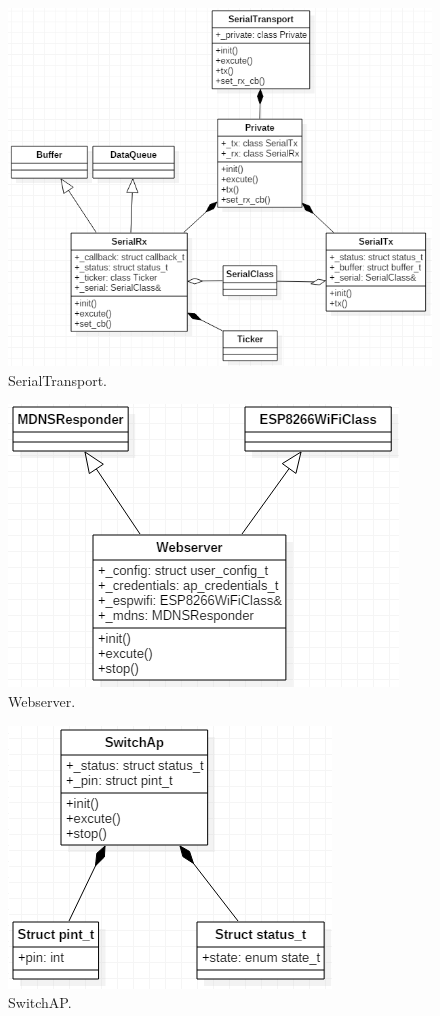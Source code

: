 \documentclass[a4paper,12pt,oneside]{article}
\begin{document}
\begin{itemize}
\begin{itemize}
\begin{figure}[H]
\centering
\includegraphics[scale=.65]{hinh/class_serialtransport.PNG}
\caption{SerialTransport.}
\end{figure}

\begin{figure}[H]
\centering
\includegraphics[scale=.85]{hinh/class_webserver.PNG}
\caption{ Webserver.}
\end{figure}

\begin{figure}[H]
\centering
\includegraphics[scale=.9]{hinh/class_switchap.PNG}
\caption{SwitchAP.}
\end{figure}


\end{itemize}
\end{itemize}
\end{document}
